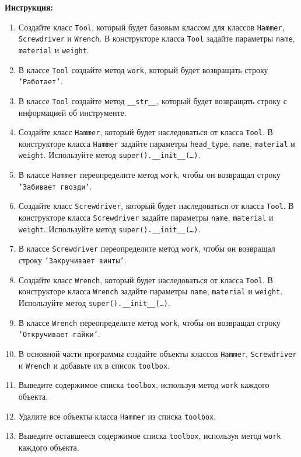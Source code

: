 \begin{enumerate}
\textbf{Инструкция:}
\begin{enumerate}
    \item Создайте класс \texttt{Tool}, который будет базовым классом для классов \texttt{Hammer}, \texttt{Screwdriver} и \texttt{Wrench}. В конструкторе класса \texttt{Tool} задайте параметры \texttt{name}, \texttt{material} и \texttt{weight}.
    \item В классе \texttt{Tool} создайте метод \texttt{work}, который будет возвращать строку \texttt{'Работает'}.
    \item В классе \texttt{Tool} создайте метод \texttt{\_\_str\_\_}, который будет возвращать строку с информацией об инструменте.
    \item Создайте класс \texttt{Hammer}, который будет наследоваться от класса \texttt{Tool}. В конструкторе класса \texttt{Hammer} задайте параметры \texttt{head\_type}, \texttt{name}, \texttt{material} и \texttt{weight}. Используйте метод \texttt{super().\_\_init\_\_(\ldots)}.
    \item В классе \texttt{Hammer} переопределите метод \texttt{work}, чтобы он возвращал строку \texttt{'Забивает гвозди'}.
    \item Создайте класс \texttt{Screwdriver}, который будет наследоваться от класса \texttt{Tool}. В конструкторе класса \texttt{Screwdriver} задайте параметры \texttt{name}, \texttt{material} и \texttt{weight}. Используйте метод \texttt{super().\_\_init\_\_(\ldots)}.
    \item В классе \texttt{Screwdriver} переопределите метод \texttt{work}, чтобы он возвращал строку \texttt{'Закручивает винты'}.
    \item Создайте класс \texttt{Wrench}, который будет наследоваться от класса \texttt{Tool}. В конструкторе класса \texttt{Wrench} задайте параметры \texttt{name}, \texttt{material} и \texttt{weight}. Используйте метод \texttt{super().\_\_init\_\_(\ldots)}.
    \item В классе \texttt{Wrench} переопределите метод \texttt{work}, чтобы он возвращал строку \texttt{'Откручивает гайки'}.
    \item В основной части программы создайте объекты классов \texttt{Hammer}, \texttt{Screwdriver} и \texttt{Wrench} и добавьте их в список \texttt{toolbox}.
    \item Выведите содержимое списка \texttt{toolbox}, используя метод \texttt{work} каждого объекта.
    \item Удалите все объекты класса \texttt{Hammer} из списка \texttt{toolbox}.
    \item Выведите оставшееся содержимое списка \texttt{toolbox}, используя метод \texttt{work} каждого объекта.

\end{enumerate}
\end{enumerate}
